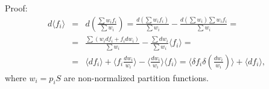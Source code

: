 Proof:
\begin{eqnarray}
\nonumber d \langle f_i \rangle &=&
d \left( \frac{\sum w_i f_i}{\sum w_i} \right) =
\frac{d(\sum w_i f_i)}{\sum w_i} - \frac{d(\sum w_i) \sum w_i f_i}{\sum w_i} = \\
\nonumber &=& \frac{\sum (w_i df_i + f_i dw_i)}{\sum w_i} - \frac{\sum dw_i}{\sum w_i} \langle f_i \rangle = \\
&=& \langle df_i \rangle + \langle f_i \frac{dw_i}{w_i} \rangle - \langle \frac{dw_i}{w_i} \rangle \langle f_i \rangle =
\langle \delta f_i \delta \left( \frac{dw_i}{w_i} \right) \rangle + \langle df_i \rangle,
\end{eqnarray}
where $w_i = p_i S$ are non-normalized partition functions.

